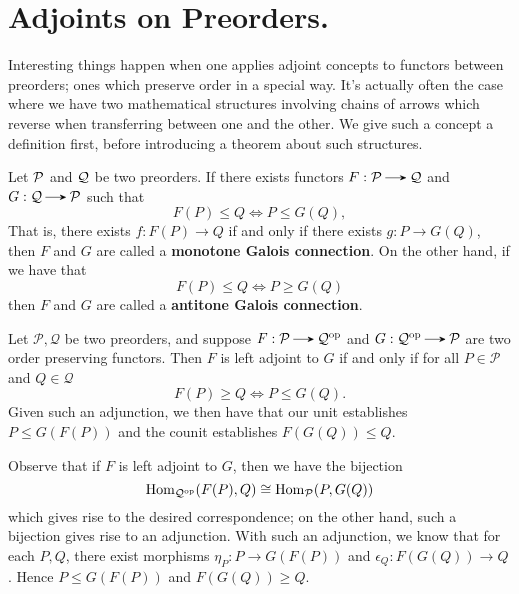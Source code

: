     

    \newpage
    \section{Adjoints on Preorders.}

    Interesting things happen when one applies adjoint concepts to
    functors between preorders; ones which preserve order in a special
    way. It's actually often the case where we have two mathematical
    structures involving chains of arrows which reverse when
    transferring between one and the other. We give such a concept a
    definition first, before introducing a theorem about such structures. 
     
    \begin{definition}
        Let $\mathcal{P}$ and $\mathcal{Q}$ be two preorders. If there exists functors 
        $F: \pp \to \qqq$ and $G:\qqq \to \pp$ such that 
        \[
            F(P) \le Q \iff P \le G(Q),  
        \]
        That is, there exists $f:F(P) \to Q$ if and only if there
        exists $g: P \to G(Q)$, then $F$ and $G$ are called a
        \textbf{monotone Galois connection}. On the other hand, 
        if we have that 
        \[
            F(P) \le Q \iff P \ge G(Q)
        \]
        then $F$ and $G$ are called a \textbf{antitone Galois
        connection}. 
    \end{definition}

    \begin{thm}
        Let $\mathcal{P}, \mathcal{Q}$ be two preorders, and suppose
        $F: \mathcal{P} \to \mathcal{Q}\op$ and
        $G:\mathcal{Q}\op \to \mathcal{P}$ are two order preserving 
        functors. Then $F$ is
        left adjoint to $G$ if and only if for all $P \in \mathcal{P}$
        and $Q \in \mathcal{Q}$ 
        \[
            F(P) \ge Q \iff P \le G(Q).
        \]
        Given such an adjunction, we then have that our unit
        establishes $P \le G(F(P))$ and the counit establishes $F(G(Q)) \le
        Q$. 
    \end{thm}

    \begin{prf}
        Observe that if $F$ is left adjoint to $G$, then we have the 
        bijection 
        \[
            \operatorname{\mathrm{Hom}}_{\mathcal{Q}^{\mathrm{op}}}(F(P), Q) \cong \operatorname{\mathrm{Hom}}_{\mathcal{P}}(P, G(Q)
            )
        \]
        which gives rise to the desired correspondence; on the other
        hand, such a bijection gives rise to an adjunction. 
        With such an adjunction, we know that for each $P, Q$, there
        exist morphisms $\eta_P: P \to G(F(P))$ and $\epsilon_Q:
        F(G(Q)) \to Q$. Hence $P \le G(F(P))$  and $F(G(Q)) \ge Q$. 
    \end{prf}

